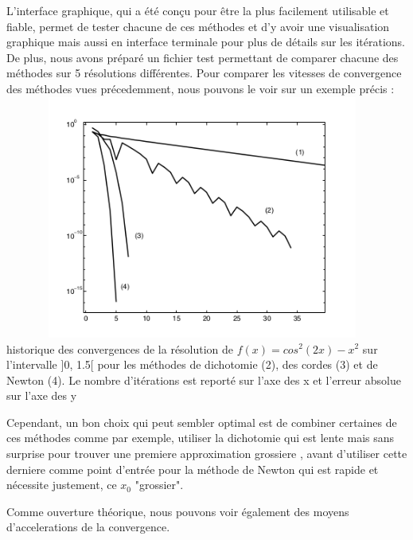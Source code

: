 \documentclass{article}
\begin{document}
    L'interface graphique, qui a été conçu pour être la plus facilement utilisable et fiable, permet de tester chacune de ces méthodes et d'y avoir une visualisation graphique mais aussi en interface terminale pour plus de détails sur les itérations. De plus, nous avons préparé un fichier test permettant de comparer chacune des méthodes sur 5 résolutions différentes.
    Pour comparer les vitesses de convergence des méthodes vues précedemment, nous pouvons le voir sur un exemple précis : \\
    \includegraphics[width=13cm,height=8cm]{img/interpretation/convergence.png}\\
historique des convergences de la résolution de $f(x) = cos^2 (2x) - x^2$ sur l’intervalle ]0, 1.5[ pour les méthodes de dichotomie (2), des cordes (3) et de Newton (4). Le nombre d’itérations est reporté sur l’axe des x et l’erreur absolue sur l’axe des y

    Cependant, un bon choix qui peut sembler optimal est de combiner certaines de ces méthodes comme par exemple, utiliser la dichotomie qui est lente mais sans surprise pour trouver une premiere approximation grossiere , avant d'utiliser cette derniere comme point d'entrée pour la méthode de Newton qui est rapide et nécessite justement, ce $x_0$ "grossier".
    
    Comme ouverture théorique, nous pouvons voir également des moyens d'accelerations de la convergence. 
\end{document}
